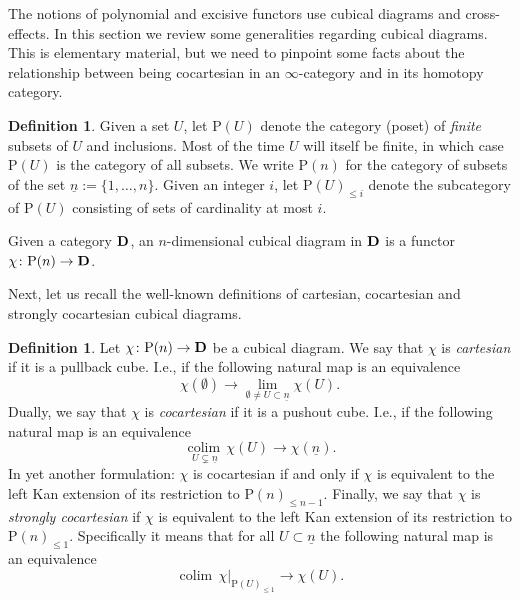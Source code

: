 \documentclass[psamsfonts]{amsart}
\theoremstyle{plain}
\theoremstyle{definition}
\newtheorem{defn}[thm]{Definition}
\theoremstyle{remark}
\newtheorem{rem}[thm]{Remark}
\newcommand{\catname}[1]{{\normalfont\textbf{#1}}}
\newcommand{\power}{\mathrm{P}}
\DeclareMathOperator{\colim}{colim \,}
\begin{document}
The notions of polynomial and excisive functors use cubical diagrams and cross-effects. In this section we review some generalities regarding cubical diagrams. This is elementary material, but we need to pinpoint some facts about the relationship between being cocartesian in an $\infty$-category and in its homotopy category.

\begin{defn}
Given a set $U$, let $\power(U)$ denote the category (poset) of \emph{finite} subsets of $U$ and inclusions. Most of the time $U$ will itself be finite, in which case $\power(U)$ is the category of all subsets. We write $\power(n)$ for the category of subsets of the set $\underline{n}:=\{1, \ldots, n\}$. Given an integer $i$, let $\power(U)_{\le i}$ denote the subcategory of $\power(U)$ consisting of sets of cardinality at most $i$. %

Given a category $\catname{D}$, an $n$-dimensional cubical diagram in $\catname{D}$ is a functor $\chi\colon \power(n)\to \catname{D}$. 
\end{defn}
Next, let us recall the well-known definitions of cartesian, cocartesian and strongly cocartesian cubical diagrams.
\begin{defn}\label{def:cocartesian} Let $\chi\colon \power(n)\to \catname{D}$ be a cubical diagram. We say that $\chi$ is {\it cartesian} if it is a pullback cube. I.e., if the following natural map is an equivalence
\[
\chi(\emptyset)\to \underset{\emptyset \ne U\subset \underline{n}}{\lim} \chi(U).
\]
Dually, we say that $\chi$ is {\it cocartesian} if it is a pushout cube. I.e., if the following natural map is an equivalence
\[
\underset{U\subsetneq \underline{n}}{\colim}\chi(U) \to \chi(\underline{n}).
\] 
In yet another formulation: $\chi$ is cocartesian if and only if $\chi$ is equivalent to the left Kan extension of its restriction to $\power(n)_{\le n-1}$. Finally, we say that $\chi$ is {\it strongly cocartesian} if $\chi$ is equivalent to the left Kan extension of its restriction to $\power(n)_{\le 1}$. Specifically it means that for all $U\subset \underline{n}$ the following natural map is an equivalence
\[
\colim \chi|_{\power(U)_{\le 1}} \to \chi(U).
\]
\end{defn}
\end{document}
